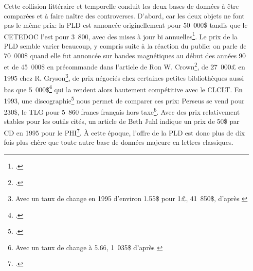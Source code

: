 Cette collision littéraire et temporelle conduit les deux bases de données à être comparées et à faire naître des controverses. D'abord, car les deux objets ne font pas le même prix: la PLD est annoncée originellement pour 50~000\$ tandis que le CETEDOC l'est pour 3~800, avec des mises à jour bi annuelles\footcite{bucknall_review_1994}. Le prix de la PLD semble varier beaucoup, y compris suite à la réaction du public: on parle de 70~000\$ quand elle fut annoncée sur bandes magnétiques au début des années 90 et de 45~000\$ en précommande dans l'article de Ron W. Crown\footcite{crown_comparing_2000}, de 27~000£ en 1995 chez R. Gryson\footnote{Avec un taux de change en 1995 d'environ 1.55\$ pour 1£, 41~850\$, d'après \cite{noauthor_british_2021}}, de prix négociés chez certaines petites bibliothèques aussi bas que 5~000\$\footcite[Note 10, p.~108]{crown_comparing_2000} qui la rendent alors hautement compétitive avec le CLCLT. En 1993, une discographie\footcite{pellen_les_1993} nous permet de comparer ces prix: Perseus se vend pour 230\$, le TLG pour 5~860 francs français hors taxe\footnote{Avec un taux de change à 5.66, 1~035\$ d'après \cite{noauthor_france_nodate}}. Avec des prix relativement stables pour les outils cités, un article de Beth Juhl indique un prix de 50\$ par CD en 1995 pour le PHI\footcite{juhl_ex_1995}. À cette époque, l'offre de la PLD est donc plus de dix fois plus chère que toute autre base de données majeure en lettres classiques.

